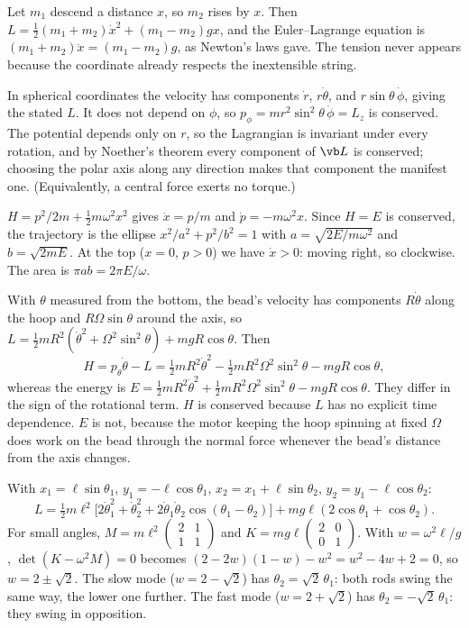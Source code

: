 
 Let $m_1$ descend a distance $x$, so $m_2$ rises by $x$. Then $L = \tfrac12(m_1+m_2)\dot x^2 + (m_1-m_2)gx$, and the Euler--Lagrange equation is $(m_1+m_2)\ddot x = (m_1-m_2)g$, as Newton's laws gave. The tension never appears because the coordinate already respects the inextensible string.

 In spherical coordinates the velocity has components $\dot r$, $r\dot\theta$, and $r\sin\theta\,\dot\phi$, giving the stated $L$. It does not depend on $\phi$, so $p_\phi = mr^2\sin^2\theta\,\dot\phi = L_z$ is conserved. The potential depends only on $r$, so the Lagrangian is invariant under every rotation, and by Noether's theorem every component of $\vb L$ is conserved; choosing the polar axis along any direction makes that component the manifest one. (Equivalently, a central force exerts no torque.)

 $H = p^2/2m + \tfrac12m\omega^2x^2$ gives $\dot x = p/m$ and $\dot p = -m\omega^2x$. Since $H = E$ is conserved, the trajectory is the ellipse $x^2/a^2 + p^2/b^2 = 1$ with $a = \sqrt{2E/m\omega^2}$ and $b = \sqrt{2mE}$. At the top ($x = 0$, $p>0$) we have $\dot x>0$: moving right, so clockwise. The area is $\pi ab = 2\pi E/\omega$.

 With $\theta$ measured from the bottom, the bead's velocity has components $R\dot\theta$ along the hoop and $R\Omega\sin\theta$ around the axis, so $L = \tfrac12mR^2(\dot\theta^2 + \Omega^2\sin^2\theta) + mgR\cos\theta$. Then
\[
  H = p_\theta\dot\theta - L = \tfrac12mR^2\dot\theta^2 - \tfrac12mR^2\Omega^2\sin^2\theta - mgR\cos\theta,
\]
whereas the energy is $E = \tfrac12mR^2\dot\theta^2 + \tfrac12mR^2\Omega^2\sin^2\theta - mgR\cos\theta$. They differ in the sign of the rotational term. $H$ is conserved because $L$ has no explicit time dependence. $E$ is not, because the motor keeping the hoop spinning at fixed $\Omega$ does work on the bead through the normal force whenever the bead's distance from the axis changes.

 With $x_1 = \ell\sin\theta_1$, $y_1 = -\ell\cos\theta_1$, $x_2 = x_1+\ell\sin\theta_2$, $y_2 = y_1-\ell\cos\theta_2$:
\[
  L = \tfrac12m\ell^2\big[2\dot\theta_1^2 + \dot\theta_2^2 + 2\dot\theta_1\dot\theta_2\cos(\theta_1-\theta_2)\big] + mg\ell(2\cos\theta_1 + \cos\theta_2).
\]
For small angles, $M = m\ell^2\begin{pmatrix}2&1\\1&1\end{pmatrix}$ and $K = mg\ell\begin{pmatrix}2&0\\0&1\end{pmatrix}$. With $w = \omega^2\ell/g$, $\det(K-\omega^2M) = 0$ becomes $(2-2w)(1-w) - w^2 = w^2 - 4w + 2 = 0$, so $w = 2\pm\sqrt2$. The slow mode ($w = 2-\sqrt2$) has $\theta_2 = \sqrt2\,\theta_1$: both rods swing the same way, the lower one further. The fast mode ($w = 2+\sqrt2$) has $\theta_2 = -\sqrt2\,\theta_1$: they swing in opposition.

